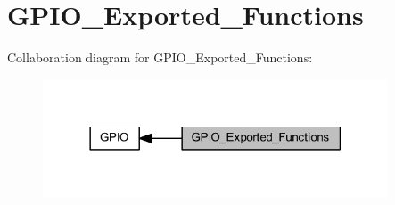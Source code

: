 \hypertarget{group___g_p_i_o___exported___functions}{}\section{G\+P\+I\+O\+\_\+\+Exported\+\_\+\+Functions}
\label{group___g_p_i_o___exported___functions}
Collaboration diagram for G\+P\+I\+O\+\_\+\+Exported\+\_\+\+Functions\+:
\nopagebreak
\begin{figure}[H]
\begin{center}
\leavevmode
\includegraphics[width=290pt]{group___g_p_i_o___exported___functions}
\end{center}
\end{figure}
